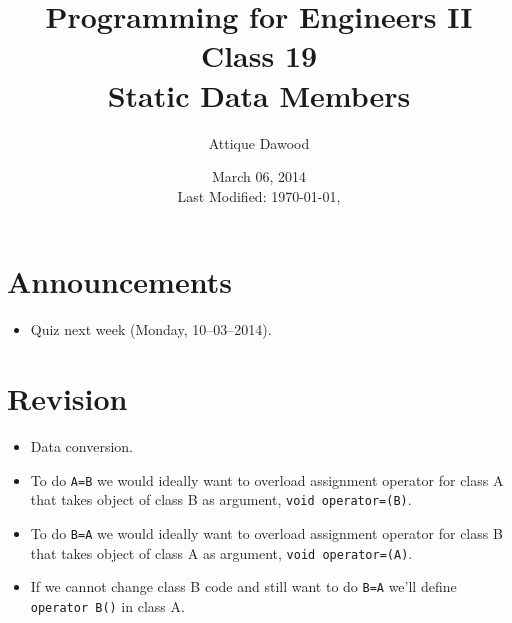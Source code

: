 \documentclass[12pt,a4paper]{article}
\title{\vspace{-2cm}Programming for Engineers II\\Class 19\\Static Data Members}
\author{Attique Dawood}
\date{March 06, 2014\\[0.2cm] Last Modified: \today, \currenttime}
\begin{document}
\maketitle
\section{Announcements}
\begin{itemize}
\item Quiz next week (Monday, 10--03--2014).
\end{itemize}
\section{Revision}
\begin{itemize}
\item Data conversion.
\item To do \verb|A=B| we would ideally want to overload assignment operator for class A that takes object of class B as argument, \verb|void operator=(B)|.
\item To do \verb|B=A| we would ideally want to overload assignment operator for class B that takes object of class A as argument, \verb|void operator=(A)|.
\item If we cannot change class B code and still want to do \verb|B=A| we'll define \verb|operator B()| in class A.
\end{itemize}
\end{document}
